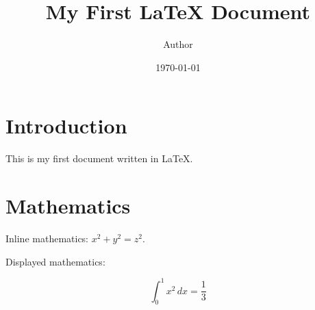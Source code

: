\documentclass{article}
\title{My First LaTeX Document}
\author{Author}
\date{\today}
\begin{document}
\maketitle

\section{Introduction}

This is my first document written in LaTeX.

\section{Mathematics}

Inline mathematics: \(x^2 + y^2 = z^2\).

Displayed mathematics:

\[
\int_0^1 x^2 \, dx = \frac{1}{3}
\]
\end{document}
